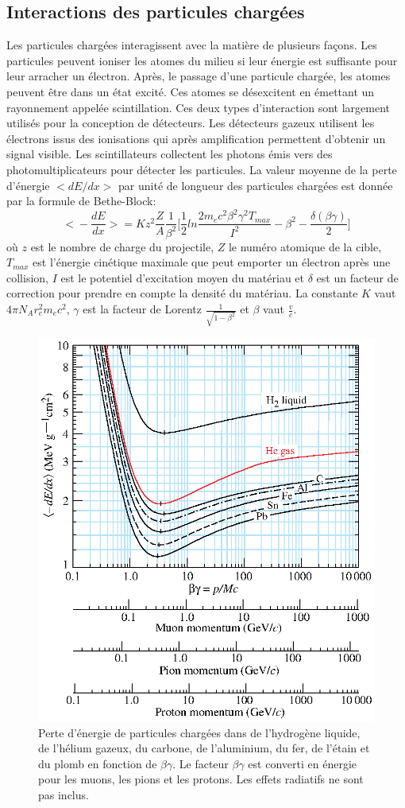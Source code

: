 \subsection{Interactions des particules chargées}
\label{sec.charged_in_matter}
Les particules chargées interagissent avec la matière de plusieurs façons. Les particules peuvent ioniser les atomes du milieu si leur énergie est suffisante pour leur arracher un électron. Après, le passage d'une particule chargée, les atomes peuvent être dans un état excité. Ces atomes se désexcitent en émettant un rayonnement appelée scintillation. Ces deux types d'interaction sont largement utilisés pour la conception de détecteurs. Les détecteurs gazeux utilisent les électrons issus des ionisations qui après amplification permettent d'obtenir un signal visible. Les scintillateurs collectent les photons émis vers des photomultiplicateurs pour détecter les particules. La valeur moyenne de la perte d'énergie $\big<dE/dx\big>$ par unité de longueur des particules chargées est donnée par la formule de Bethe-Block:
\begin{equation}
  \big<-\frac{dE}{dx}\big>=Kz^2\frac{Z}{A}\frac{1}{\beta^2}\big[\frac{1}{2}ln\frac{2m_ec^2\beta^2\gamma^2T_{max}}{I^2}-\beta^2-\frac{\delta(\beta\gamma)}{2}\big]
\label{eq.bethe}
\end{equation}
où $z$ est le nombre de charge du projectile, $Z$ le numéro atomique de la cible, $T_{max}$ est l'énergie cinétique maximale que peut emporter un électron après une collision, $I$ est le potentiel d'excitation moyen du matériau et $\delta$ est un facteur de correction pour prendre en compte la densité du matériau. La constante $K$ vaut $4\pi N_Ar_e^2m_ec^2$, $\gamma$ est la facteur de Lorentz $\frac{1}{\sqrt{1-\beta^2}}$ et $\beta$ vaut $\frac{v}{c}$.
\begin{figure}[!h]
  \begin{center}
    \includegraphics[width=.6\textwidth]{ShowerTh/figs/dedx_table_98.eps}
    \caption{Perte d'énergie de particules chargées dans de l'hydrogène liquide, de l'hélium gazeux, du carbone, de l'aluminium, du fer, de l'étain et du plomb en fonction de $\beta\gamma$. Le facteur $\beta\gamma$ est converti en énergie pour les muons, les pions et les protons. Les effets radiatifs ne sont pas inclus.}
    \label{fig:charged_in_matter}
  \end{center}
\end{figure}
